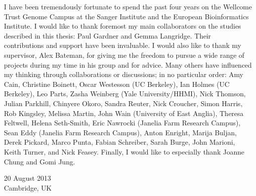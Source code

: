 

\begin{acknowledgementslong} 

I have been tremendously fortunate to spend the past four years on the Wellcome Trust Genome Campus at the Sanger Institute and the European Bioinformatics Institute. I would like to thank foremost my main collaborators on the studies described in this thesis: Paul Gardner and Gemma Langridge. Their contributions and support have been invaluable. I would also like to thank my supervisor, Alex Bateman, for giving me the freedom to pursue a wide range of projects during my time in his group and for advice. Many others have influenced my thinking through collaborations or discussions; in no particular order: Amy Cain, Christine Boinett, Oscar Westesson (UC Berkeley), Ian Holmes (UC Berkeley), Leo Parts, Zasha Weinberg (Yale University/HHMI), Nick Thomson, Julian Parkhill, Chinyere Okoro, Sandra Reuter, Nick Croucher, Simon Harris, Rob Kingsley, Melissa Martin, John Wain (University of East Anglia), Theresa Feltwell, Helena Seth-Smith, Eric Nawrocki (Janelia Farm Research Campus), Sean Eddy (Janelia Farm Research Campus), Anton Enright, Marija Buljan, Derek Pickard, Marco Punta, Fabian Schreiber, Sarah Burge, John Marioni, Keith Turner, and Nick Feasey. Finally, I would like to especially thank Joanne Chung and Gomi Jung.

\vspace{10 mm}
\noindent
 \begin{flushright}
20 August 2013\\
Cambridge, UK
\end{flushright}

\end{acknowledgementslong}


